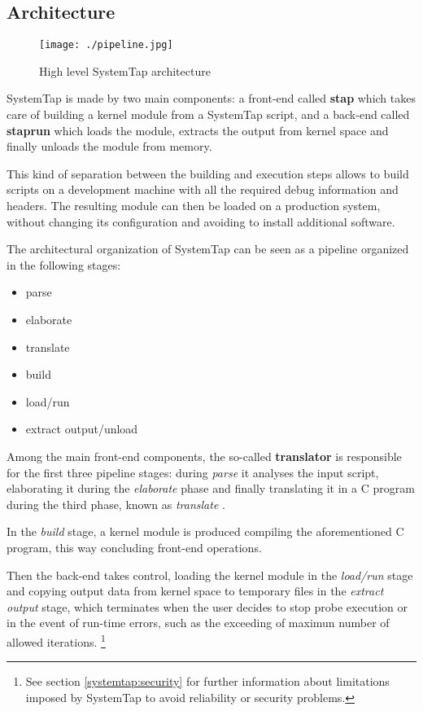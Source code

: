 \documentclass[11pt]{article}
\begin{document}
\subsection{Architecture}
\begin{figure}[tb]
  \caption{High level SystemTap architecture}
  \centering
      \texttt{[image: ./pipeline.jpg]}
\end{figure}

SystemTap is made by two main components: a front-end called \textbf{stap}
which takes care of building a kernel module from a SystemTap script, and a
back-end called \textbf{staprun} which loads the module, extracts the output
from kernel space and finally unloads the module from memory.

This kind of separation between the building and execution steps allows to
build scripts on a development machine with all the required debug information
and headers. The resulting module can then be loaded on a production system,
without changing its configuration and avoiding to install additional software.

The architectural organization of SystemTap can be seen as a pipeline
\cite{arch2005} organized in the following stages:

\begin{itemize}
    \item parse
    \item elaborate
    \item translate
    \item build
    \item load/run
    \item extract output/unload
\end{itemize}

Among the main front-end components, the so-called \textbf{translator} is
responsible for the first three pipeline stages: during \emph{parse} it
analyses the input script, elaborating it during the \emph{elaborate} phase and
finally translating it in a C program during the third phase, known as
\emph{translate} \cite{arch2005}.

In the \emph{build} stage, a kernel module is produced compiling the
aforementioned C program, this way concluding front-end operations.

Then the back-end takes control, loading the kernel module in the
\emph{load/run} stage and copying output data from kernel space to temporary
files in the \emph{extract output} stage, which terminates when the user
decides to stop probe execution or in the event of run-time errors, such as the
exceeding of maximun number of allowed iterations.
\footnote{See section \ref{systemtap:security} for further information about
limitations imposed by SystemTap to avoid reliability or security problems.}
\end{document}

